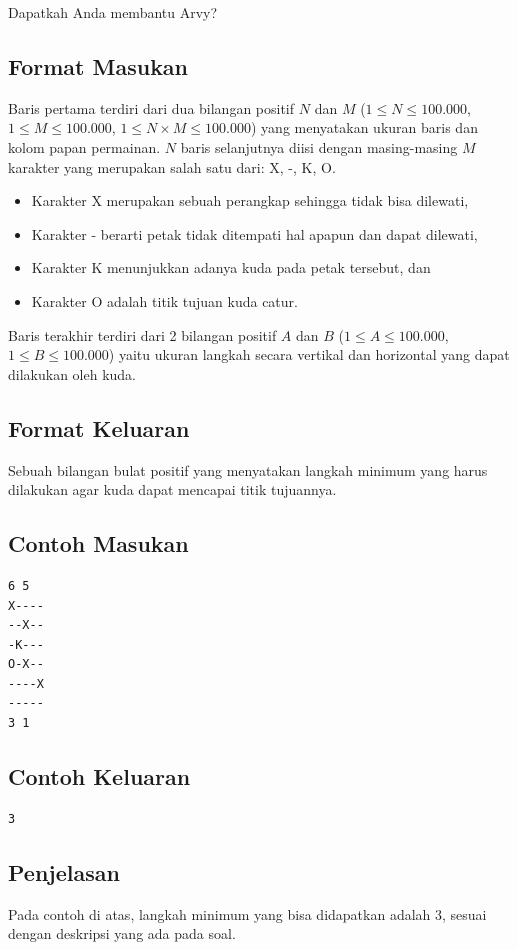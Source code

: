 \documentclass{article}
\begin{document}
Dapatkah Anda membantu Arvy?

\subsection*{Format Masukan}

Baris pertama terdiri dari dua bilangan positif $N$ dan $M$ ($1 \leq N \leq 100.000$, $1 \leq M \leq 100.000$, $1 \leq N \times M \leq 100.000$) yang menyatakan ukuran baris dan kolom papan permainan.
$N$ baris selanjutnya diisi dengan masing-masing $M$ karakter yang merupakan salah satu dari: X, -, K, O.

\begin{itemize}
    \setlength\itemsep{0pt}
    \item Karakter X merupakan sebuah perangkap sehingga tidak bisa dilewati,
    \item Karakter - berarti petak tidak ditempati hal apapun dan dapat dilewati,
    \item Karakter K menunjukkan adanya kuda pada petak tersebut, dan
    \item Karakter O adalah titik tujuan kuda catur.
\end{itemize}

Baris terakhir terdiri dari 2 bilangan positif $A$ dan $B$ ($1 \leq A \leq 100.000$, $1 \leq B \leq 100.000$) yaitu ukuran langkah secara vertikal dan horizontal yang dapat dilakukan oleh kuda.

\subsection*{Format Keluaran}

Sebuah bilangan bulat positif yang menyatakan  langkah minimum yang harus dilakukan agar kuda dapat mencapai titik tujuannya.
\\

\begin{multicols}{2}
\subsection*{Contoh Masukan}
\begin{lstlisting}
6 5
X----
--X--
-K---
O-X--
----X
-----
3 1
\end{lstlisting}
\columnbreak
\subsection*{Contoh Keluaran}
\begin{lstlisting}
3
\end{lstlisting}
\vfill
\null
\end{multicols}

\subsection*{Penjelasan}
Pada contoh di atas, langkah minimum yang bisa didapatkan adalah 3, sesuai dengan deskripsi yang ada pada soal.
\pagebreak
\end{document}

